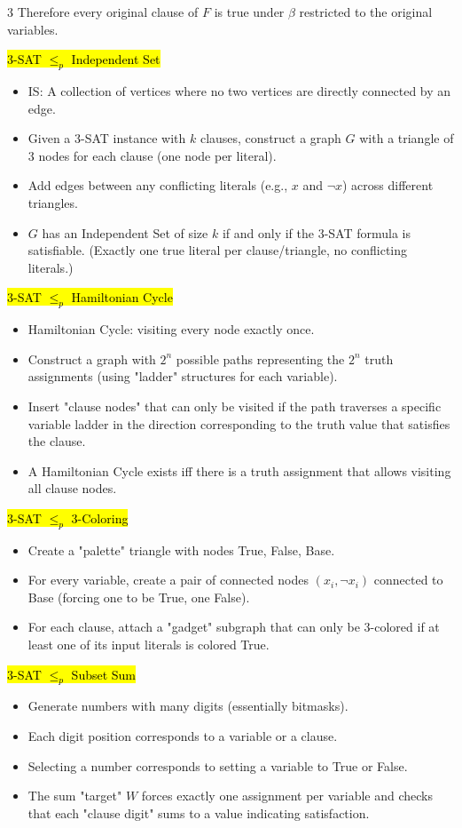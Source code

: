 \documentclass[letterpaper]{article}
\begin{document}
\begin{multicols*}{3}
    Therefore every original clause of $F$ is true under $\beta$ restricted to the original variables.

    \hl{3-SAT $\le_p$ Independent Set}
    \begin{itemize}
        \item IS: A collection of vertices where no two vertices are directly connected by an edge.
        \item Given a 3-SAT instance with $k$ clauses, construct a graph $G$ with a triangle of 3 nodes for each clause (one node per literal).
        \item Add edges between any conflicting literals (e.g., $x$ and $\neg x$) across different triangles.
        \item $G$ has an Independent Set of size $k$ if and only if the 3-SAT formula is satisfiable. (Exactly one true literal per clause/triangle, no conflicting literals.)
    \end{itemize}

    \hl{3-SAT $\le_p$ Hamiltonian Cycle}
    \begin{itemize}
        \item Hamiltonian Cycle: visiting every node exactly once.
        \item Construct a graph with $2^n$ possible paths representing the $2^n$ truth assignments (using "ladder" structures for each variable).
        \item Insert "clause nodes" that can only be visited if the path traverses a specific variable ladder in the direction corresponding to the truth value that satisfies the clause.
        \item A Hamiltonian Cycle exists iff there is a truth assignment that allows visiting all clause nodes.
    \end{itemize}

    \hl{3-SAT $\le_p$ 3-Coloring}
    \begin{itemize}
        \item Create a "palette" triangle with nodes True, False, Base.
        \item For every variable, create a pair of connected nodes $(x_i, \neg x_i)$ connected to Base (forcing one to be True, one False).
        \item For each clause, attach a "gadget" subgraph that can only be 3-colored if at least one of its input literals is colored True.
    \end{itemize}

    \hl{3-SAT $\le_p$ Subset Sum}
    \begin{itemize}
        \item Generate numbers with many digits (essentially bitmasks).
        \item Each digit position corresponds to a variable or a clause.
        \item Selecting a number corresponds to setting a variable to True or False.
        \item The sum "target" $W$ forces exactly one assignment per variable and checks that each "clause digit" sums to a value indicating satisfaction.
    \end{itemize}


\end{multicols*}
\end{document}
